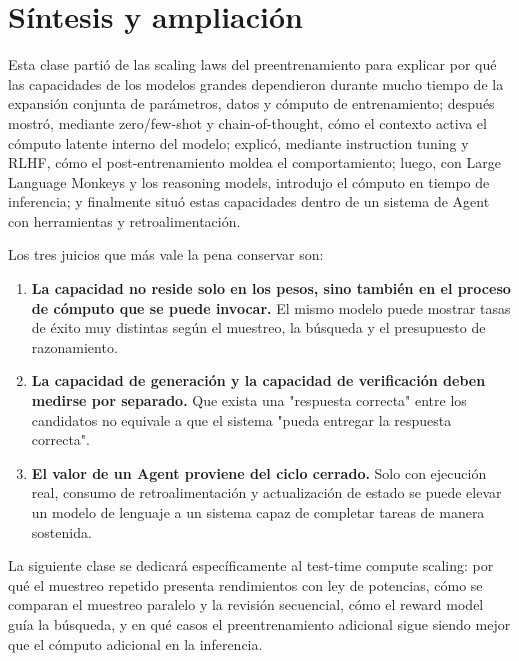 \section{Síntesis y ampliación}

Esta clase partió de las scaling laws del preentrenamiento para explicar por qué las capacidades de los modelos grandes dependieron durante mucho tiempo de la expansión conjunta de parámetros, datos y cómputo de entrenamiento; después mostró, mediante zero/few-shot y chain-of-thought, cómo el contexto activa el cómputo latente interno del modelo; explicó, mediante instruction tuning y RLHF, cómo el post-entrenamiento moldea el comportamiento; luego, con Large Language Monkeys y los reasoning models, introdujo el cómputo en tiempo de inferencia; y finalmente situó estas capacidades dentro de un sistema de Agent con herramientas y retroalimentación.

Los tres juicios que más vale la pena conservar son:

\begin{enumerate}
    \item \textbf{La capacidad no reside solo en los pesos, sino también en el proceso de cómputo que se puede invocar.} El mismo modelo puede mostrar tasas de éxito muy distintas según el muestreo, la búsqueda y el presupuesto de razonamiento.
    \item \textbf{La capacidad de generación y la capacidad de verificación deben medirse por separado.} Que exista una "respuesta correcta" entre los candidatos no equivale a que el sistema "pueda entregar la respuesta correcta".
    \item \textbf{El valor de un Agent proviene del ciclo cerrado.} Solo con ejecución real, consumo de retroalimentación y actualización de estado se puede elevar un modelo de lenguaje a un sistema capaz de completar tareas de manera sostenida.
\end{enumerate}

La siguiente clase se dedicará específicamente al test-time compute scaling: por qué el muestreo repetido presenta rendimientos con ley de potencias, cómo se comparan el muestreo paralelo y la revisión secuencial, cómo el reward model guía la búsqueda, y en qué casos el preentrenamiento adicional sigue siendo mejor que el cómputo adicional en la inferencia.


